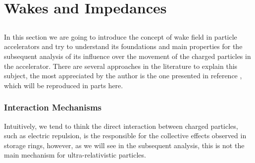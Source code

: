 \chapter{Wakes and Impedances}\label{cap:wake_impedances}

\section{}

In this section we are going to introduce the concept of wake field in particle accelerators and try to understand its foundations and main properties for the subsequent analysis of its influence over the movement of the charged particles in the accelerator. There are several approaches in the literature to explain this subject, the most appreciated by the author is the one presented in reference \cite{Stupakov2000a}, which will be reproduced in parts here.

\subsection{Interaction Mechanisms}\label{ssec:interation_mechanisms}

Intuitively, we tend to think the direct interaction between charged particles, such as electric repulsion, is the responsible for the collective effects observed in storage rings, however, as we will see in the subsequent analysis, this is not the main mechanism for ultra-relativistic particles.

